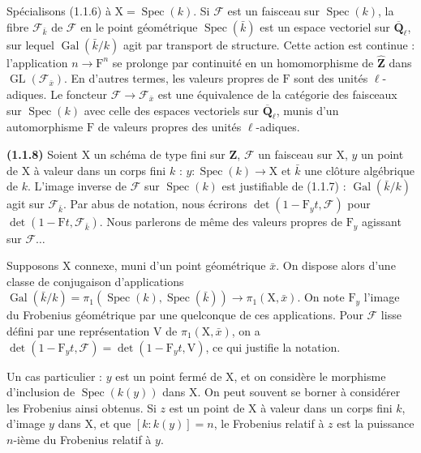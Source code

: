 \documentclass[11pt,leqno]{article}
\begin{document}
Spécialisons (1.1.6) à \(\mathrm{X}=\operatorname{Spec}(k)\). Si \(\mathscr{F}\) est un faisceau sur \(\operatorname{Spec}(k)\), la fibre \(\mathscr{F}_{\bar k}\) de \(\mathscr{F}\) en le point géométrique \(\operatorname{Spec}(\bar k)\) est un espace vectoriel sur \(\overline{\mathbf{Q}}_\ell\), sur lequel \(\operatorname{Gal}(\bar k/k)\) agit par transport de structure. Cette action est continue : l’application \(n\to\mathrm{F}^n\) se prolonge par continuité en un homomorphisme de \(\widehat{\mathbf{Z}}\) dans \(\operatorname{GL}(\mathscr{F}_{\bar x})\). En d’autres termes, les valeurs propres de \(\mathrm{F}\) sont des unités \(\ell\)-adiques. Le foncteur \(\mathscr{F}\to\mathscr{F}_{\bar x}\) est une équivalence de la catégorie des faisceaux sur \(\operatorname{Spec}(k)\) avec celle des espaces vectoriels sur \(\overline{\mathbf{Q}}_\ell\), munis d’un automorphisme \(\mathrm{F}\) de valeurs propres des unités \(\ell\)-adiques.

\textbf{(1.1.8)} Soient \(\mathrm{X}\) un schéma de type fini sur \(\mathbf{Z}\), \(\mathscr{F}\) un faisceau sur \(\mathrm{X}\), \(y\) un point de \(\mathrm{X}\) à valeur dans un corps fini \(k\) : \(y:\operatorname{Spec}(k)\to\mathrm{X}\) et \(\bar k\) une clôture algébrique de \(k\). L’image inverse de \(\mathscr{F}\) sur \(\operatorname{Spec}(k)\) est justifiable de (1.1.7) : \(\operatorname{Gal}(\bar k/k)\) agit sur \(\mathscr{F}_{\bar k}\). Par abus de notation, nous écrirons \(\det(1-\mathrm{F}_y t,\mathscr{F})\) pour \(\det(1-\mathrm{F}t,\mathscr{F}_{\bar k})\). Nous parlerons de même des valeurs propres de \(\mathrm{F}_y\) agissant sur \(\mathscr{F}\ldots\)

Supposons \(\mathrm{X}\) connexe, muni d’un point géométrique \(\bar x\). On dispose alors d’une classe de conjugaison d’applications \(\operatorname{Gal}(\bar k/k)=\pi_1(\operatorname{Spec}(k),\operatorname{Spec}(\bar k))\to\pi_1(\mathrm{X},\bar x)\). On note \(\mathrm{F}_y\) l’image du Frobenius géométrique par une quelconque de ces applications. Pour \(\mathscr{F}\) lisse défini par une représentation \(\mathrm{V}\) de \(\pi_1(\mathrm{X},\bar x)\), on a \(\det(1-\mathrm{F}_y t,\mathscr{F})=\det(1-\mathrm{F}_y t,\mathrm{V})\), ce qui justifie la notation.

Un cas particulier : \(y\) est un point fermé de \(\mathrm{X}\), et on considère le morphisme d’inclusion de \(\operatorname{Spec}(k(y))\) dans \(\mathrm{X}\). On peut souvent se borner à considérer les Frobenius ainsi obtenus. Si \(z\) est un point de \(\mathrm{X}\) à valeur dans un corps fini \(k\), d’image \(y\) dans \(\mathrm{X}\), et que \([k:k(y)]=n\), le Frobenius relatif à \(z\) est la puissance \(n\)-ième du Frobenius relatif à \(y\).
\end{document}

